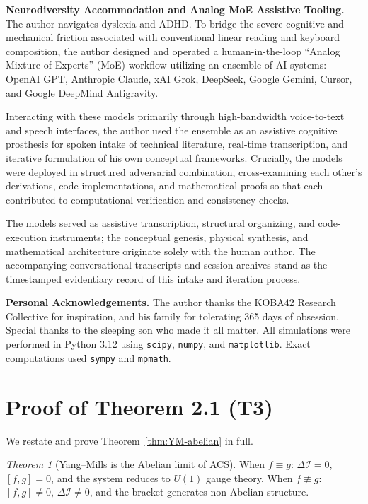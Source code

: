 \documentclass[11pt,a4paper]{article}
\theoremstyle{plain}
\theoremstyle{definition}
\theoremstyle{remark}
\newtheorem*{theorem*}{Theorem}
\newcommand{\DI}{\Delta\mathcal{I}}
\begin{document}
\vspace{0.5em}
\noindent\textbf{Neurodiversity Accommodation and Analog MoE Assistive Tooling.}
The author navigates dyslexia and ADHD. To bridge the severe cognitive and mechanical friction associated with conventional linear reading and keyboard composition, the author designed and operated a human-in-the-loop ``Analog Mixture-of-Experts'' (MoE) workflow utilizing an ensemble of AI systems: OpenAI GPT, Anthropic Claude, xAI Grok, DeepSeek, Google Gemini, Cursor, and Google DeepMind Antigravity.

Interacting with these models primarily through high-bandwidth voice-to-text and speech interfaces, the author used the ensemble as an assistive cognitive prosthesis for spoken intake of technical literature, real-time transcription, and iterative formulation of his own conceptual frameworks. Crucially, the models were deployed in structured adversarial combination, cross-examining each other's derivations, code implementations, and mathematical proofs so that each contributed to computational verification and consistency checks.

The models served as assistive transcription, structural organizing, and code-execution instruments; the conceptual genesis, physical synthesis, and mathematical architecture originate solely with the human author. The accompanying conversational transcripts and session archives stand as the timestamped evidentiary record of this intake and iteration process.

\vspace{0.5em}
\noindent\textbf{Personal Acknowledgements.}
The author thanks the KOBA42 Research Collective for inspiration, and his family for tolerating 365 days of obsession. Special thanks to the sleeping son who made it all matter. All simulations were performed in Python 3.12 using \texttt{scipy}, \texttt{numpy}, and \texttt{matplotlib}. Exact computations used \texttt{sympy} and \texttt{mpmath}.

\appendix

\clearpage
\section{Proof of Theorem 2.1 (T3)}
\label{app:T3}

We restate and prove Theorem~\ref{thm:YM-abelian} in full.

\begin{theorem*}[Yang--Mills is the Abelian limit of ACS]
When $f \equiv g$: $\DI = 0$, $[f,g] = 0$, and the system reduces to 
$U(1)$ gauge theory.  When $f \not\equiv g$: $[f,g] \neq 0$, 
$\DI \neq 0$, and the bracket generates non-Abelian structure.
\end{theorem*}
\end{document}
